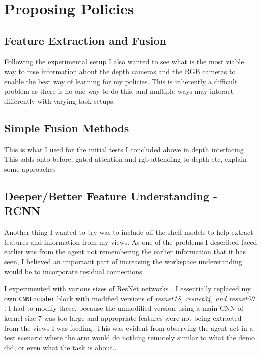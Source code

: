 \section{Proposing Policies}

\subsection{Feature Extraction and Fusion}
Following the experimental setup I also wanted to see what is the most viable way to fuse information about the depth cameras and the RGB cameras to enable the best way of learning for my policies. This is inherently a difficult problem as there is no one way to do this, and multiple ways may interact differently with varying task setups.

\subsection{Simple Fusion Methods}
This is what I used for the initial tests I concluded above in depth interfacing
This adds onto before, gated attention and rgb attending to depth etc, explain some approaches

\subsection{Deeper/Better Feature Understanding - RCNN}
Another thing I wanted to try was to include off-the-shelf models to help extract features and information from my views. As one of the problems I described faced earlier was from the agent not remembering the earlier information that it has seen, I believed an important part of increasing the workspace understanding would be to incorporate residual connections.

I experimented with various sizes of ResNet networks . I essentially replaced my own \verb|CNNEncoder| block with modified versions of \emph{resnet18, resnet34, and resnet50} . I had to modify these, because the unmodified version using a main CNN of kernel size $7$ was too large and appropriate features were not being extracted from the views I was feeding. This was evident from observing the agent act in a test scenario where the arm would do nothing remotely similar to what the demo did, or even what the task is about.. 

